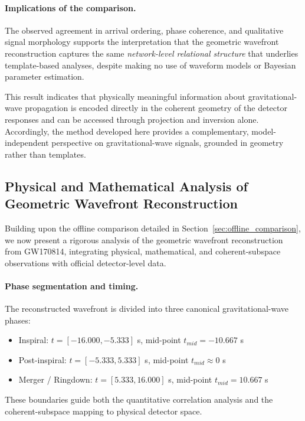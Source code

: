 \documentclass[11pt,a4paper]{article}
\begin{document}
\paragraph{Implications of the comparison.}
The observed agreement in arrival ordering, phase coherence, and qualitative
signal morphology supports the interpretation that the geometric wavefront reconstruction
captures the same \emph{network-level relational structure} that underlies
template-based analyses, despite making no use of waveform models or Bayesian
parameter estimation.

This result indicates that physically meaningful information about
gravitational-wave propagation is encoded directly in the coherent geometry of
the detector responses and can be accessed through projection and inversion
alone.
Accordingly, the method developed here provides a complementary,
model-independent perspective on gravitational-wave signals, grounded in
geometry rather than templates.

\subsection{Physical and Mathematical Analysis of Geometric Wavefront Reconstruction}
\label{sec:physical_analysis}

Building upon the offline comparison detailed in Section~\ref{sec:offline_comparison}, we now present a rigorous analysis of the geometric wavefront reconstruction from GW170814, integrating physical, mathematical, and coherent-subspace observations with official detector-level data.

\paragraph{Phase segmentation and timing.}
The reconstructed wavefront is divided into three canonical gravitational-wave phases:
\begin{itemize}
    \item Inspiral: $t = [-16.000, -5.333]$ s, mid-point $t_{mid} = -10.667$ s
    \item Post-inspiral: $t = [-5.333, 5.333]$ s, mid-point $t_{mid} \approx 0$ s
    \item Merger / Ringdown: $t = [5.333, 16.000]$ s, mid-point $t_{mid} = 10.667$ s
\end{itemize}
These boundaries guide both the quantitative correlation analysis and the coherent-subspace mapping to physical detector space.
\end{document}
